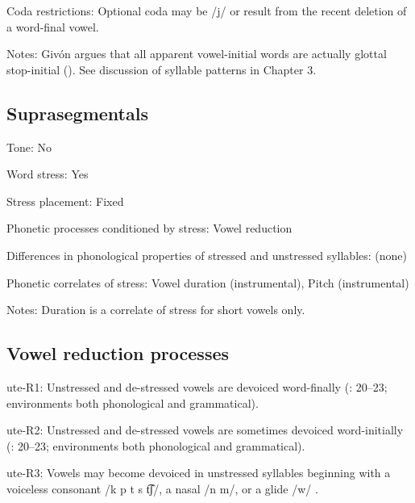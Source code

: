 {\begin{appendixdesc}
\item[Coda restrictions:] Optional coda may be /j/ or result from the recent deletion of a word-final vowel. 

\item[Notes:] Givón argues that all apparent vowel-initial words are actually glottal stop-initial (\citeyear[28]{Givón2011}). See discussion of syllable patterns in Chapter 3.
\end{appendixdesc}
\subsection*{Suprasegmentals}
\begin{appendixdesc}
\item[Tone:] No

\item[Word stress:] Yes

\item[Stress placement:] Fixed

\item[Phonetic processes conditioned by stress:] Vowel reduction

\item[Differences in phonological properties of stressed and unstressed syllables:] (none)

\item[Phonetic correlates of stress:] Vowel duration (instrumental), Pitch (instrumental)

\item[Notes:] Duration is a correlate of stress for short vowels only.
\end{appendixdesc}
\subsection*{Vowel reduction processes}
\begin{appendixdesc}

\item[ute-R1:] Unstressed and de-stressed vowels are devoiced word-finally (\citealt{Givón2011}: 20--23; environments both phonological and grammatical).

\item[ute-R2:] Unstressed and de-stressed vowels are sometimes devoiced word-initially (\citealt{Givón2011}: 20--23; environments both phonological and grammatical).

\item[ute-R3:] Vowels may become devoiced in unstressed syllables beginning with a voiceless consonant /k p t s t͡ʃ/, a nasal /n m/, or a glide /w/ \citep[21]{Givón2011}.
\end{appendixdesc}
}
